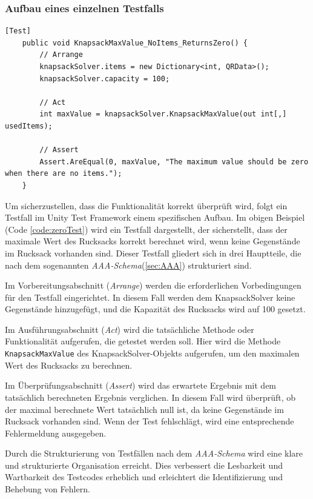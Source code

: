 \begin{itemize}
\subsubsection{Aufbau eines einzelnen Testfalls}

\begin{lstlisting}[style=csharp, caption={einzelner Testfall}, label={code:zeroTest}]
    [Test]
    public void KnapsackMaxValue_NoItems_ReturnsZero() {
        // Arrange
        knapsackSolver.items = new Dictionary<int, QRData>();
        knapsackSolver.capacity = 100;

        // Act
        int maxValue = knapsackSolver.KnapsackMaxValue(out int[,] usedItems);

        // Assert
        Assert.AreEqual(0, maxValue, "The maximum value should be zero when there are no items.");
    }
\end{lstlisting}

Um sicherzustellen, dass die Funktionalität korrekt überprüft wird, folgt ein Testfall im Unity Test Framework einem spezifischen Aufbau. Im obigen Beispiel (Code \ref{code:zeroTest}) wird ein Testfall dargestellt, der sicherstellt, dass der maximale Wert des Rucksacks korrekt berechnet wird, wenn keine Gegenstände im Rucksack vorhanden sind. Dieser Testfall gliedert sich in drei Hauptteile, die nach dem sogenannten \textit{AAA-Schema}(\ref{sec:AAA}) strukturiert sind.

Im Vorbereitungsabschnitt (\textit{Arrange}) werden die erforderlichen Vorbedingungen für den Testfall eingerichtet. In diesem Fall werden dem KnapsackSolver keine Gegenstände hinzugefügt, und die Kapazität des Rucksacks wird auf 100 gesetzt.

Im Ausführungsabschnitt (\textit{Act}) wird die tatsächliche Methode oder Funktionalität aufgerufen, die getestet werden soll. Hier wird die Methode \texttt{KnapsackMaxValue} des KnapsackSolver-Objekts aufgerufen, um den maximalen Wert des Rucksacks zu berechnen.

Im Überprüfungsabschnitt (\textit{Assert}) wird das erwartete Ergebnis mit dem tatsächlich berechneten Ergebnis verglichen. In diesem Fall wird überprüft, ob der maximal berechnete Wert tatsächlich null ist, da keine Gegenstände im Rucksack vorhanden sind. Wenn der Test fehlschlägt, wird eine entsprechende Fehlermeldung ausgegeben.

Durch die Strukturierung von Testfällen nach dem \textit{AAA-Schema} wird eine klare und strukturierte Organisation erreicht. Dies verbessert die Lesbarkeit und Wartbarkeit des Testcodes erheblich und erleichtert die Identifizierung und Behebung von Fehlern.


\end{itemize}

